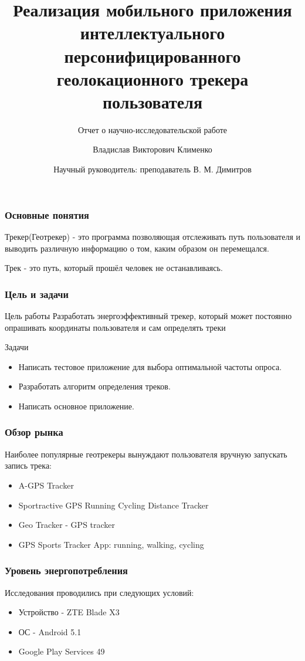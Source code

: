 \documentclass[hyperref={unicode}]{beamer}
\title[%
    Бобры и Интернет
]{%
	Реализация мобильного приложения \\
	интеллектуального персонифицированного\\
	геолокационного трекера пользователя
}
\subtitle{Отчет о научно-исследовательской работе}
\author[%
    Владислав Клименко
]{%
    Владислав Викторович Клименко
}
\date[%
    01.06.2018
]{%
    Научный руководитель: преподаватель  В. М. Димитров
}
\institute[%
    ПетрГУ
]{%
    Петрозаводский государственный университет\\
    Кафедра информатики и математического обеспечения
}
\begin{document}
\begin{frame}
\maketitle
\end{frame}

\begin{frame}
  \frametitle{Основные понятия}
  Трекер(Геотрекер) - это программа позволяющая отслеживать путь пользователя и выводить
  различную информацию о том, каким образом он перемещался.
  
  Трек - это путь, который прошёл человек не останавливаясь.
\end{frame}

\begin{frame}
  \frametitle{Цель и задачи}
  \begin{block}{Цель работы}
    Разработать энергоэффективный трекер, который может
    постоянно опрашивать координаты пользователя и сам определять треки
  \end{block}
  \begin{block}{Задачи}
  \begin{itemize}
  	\item Написать тестовое приложение для выбора оптимальной частоты опроса.
  	\item Разработать алгоритм определения треков.
  	\item Написать основное приложение.
  \end{itemize}
  \end{block}
\end{frame}

\begin{frame}
\frametitle{Обзор рынка}
Наиболее популярные геотрекеры вынуждают пользователя вручную запускать запись трека:
\begin{itemize}
	\item A-GPS Tracker
	\item Sportractive GPS Running Cycling Distance Tracker
	\item Geo Tracker - GPS tracker
	\item GPS Sports Tracker App: running, walking, cycling
\end{itemize}

\end{frame}
\begin{frame}
\frametitle{Уровень энергопотребления}
Исследования проводились при следующих условий:
\begin{itemize}
	\item Устройство - ZTE Blade X3
	\item ОС - Android 5.1
	\item Google Play Services 49
\end{itemize}

\end{frame}
\end{document}
